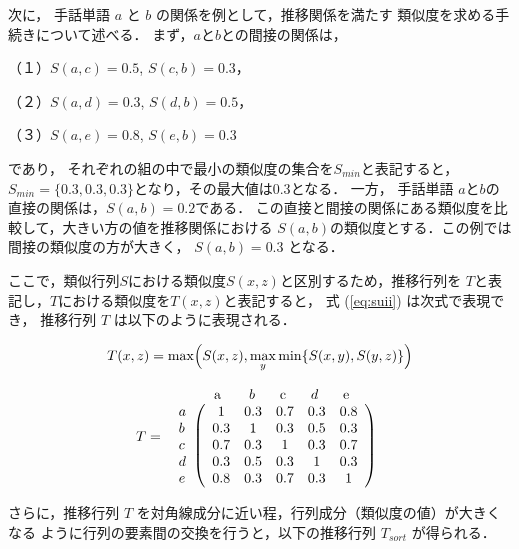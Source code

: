 次に，
手話単語 $a$ と $b$ の関係を例として，推移関係を満たす
類似度を求める手続きについて述べる．
まず，$a$と$b$との間接の関係は，

（１）$S(a,c)=0.5$, $S(c,b)=0.3$，

（２）$S(a,d)=0.3$, $S(d,b)=0.5$，

（３）$S(a,e)=0.8$, $S(e,b)=0.3$ 

\noindent であり，
それぞれの組の中で最小の類似度の集合を$S_{min}$と表記すると，
$S_{min} = \{0.3,0.3,0.3 \}$となり，その最大値は$0.3$となる．
一方， 手話単語 $a$と$b$の直接の関係は，$S(a,b) = 0.2$である．
この直接と間接の関係にある類似度を比較して，大きい方の値を推移関係における
$S(a,b)$の類似度とする．この例では間接の類似度の方が大きく，
$S(a,b)=0.3$ となる．

ここで，類似行列$S$における類似度$S(x,z)$と区別するため，推移行列を
$T$と表記し，$T$における類似度を$T(x,z)$と表記すると，
式 (\ref{eq:suii}) は次式で表現でき，
推移行列 $T$ は以下のように表現される．

\begin{equation}\label{eq:trans}
 T(x,z)=\max \Bigl( S(x,z),\max_{y}\min\{S(x,y),S(y,z)\} \Bigr)
\end{equation}


\[ T =
\begin{array}{r@{}l}
& \begin{array}{ccccc}
\makebox[2.5em]{a}& b& \makebox[2.0em]{c}& d& \makebox[2.0em]{e}
\end{array}\\
\begin{array}{l}
a\\ b\\ c\\ d\\ e
\end{array} &
\left(
\begin{array}{ccccc}
1 & 0.3 & 0.7 & 0.3 & 0.8 \\
0.3 & 1 & 0.3 & 0.5 & 0.3 \\
0.7 & 0.3 & 1 & 0.3 & 0.7 \\
0.3 & 0.5 & 0.3 & 1 & 0.3 \\
0.8 & 0.3 & 0.7 & 0.3 & 1
\end{array}
\right)
\end{array}
\]

さらに，推移行列 $T$ を対角線成分に近い程，行列成分（類似度の値）が大きくなる
ように行列の要素間の交換を行うと，以下の推移行列 $T_{sort}$
が得られる．

